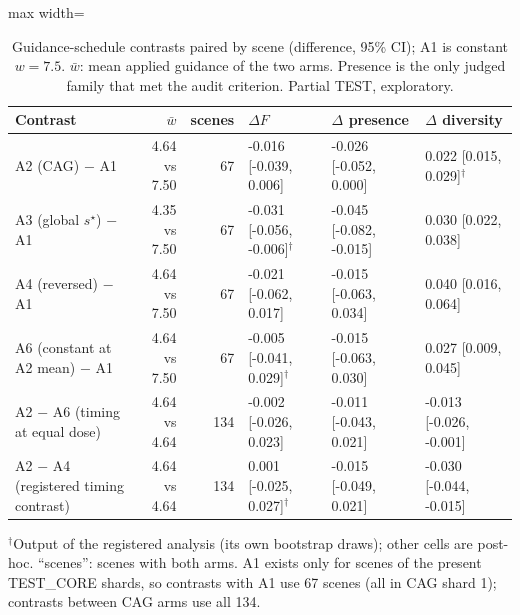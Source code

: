 \begin{table}[t]\centering\small
\caption{Guidance-schedule contrasts paired by scene (difference, 95\% CI); A1 is constant $w = 7.5$. $\bar w$: mean applied guidance of the two arms. Presence is the only judged family that met the audit criterion. Partial TEST, exploratory.}\label{tab:partial-he-arms}
\begin{adjustbox}{max width=\linewidth}\begin{tabular}{lrrlll}
\toprule
Contrast & $\bar w$ & scenes & $\Delta F$ & $\Delta$ presence & $\Delta$ diversity \\
\midrule
A2 (CAG) $-$ A1 & 4.64 vs 7.50 & 67 & -0.016 [-0.039, 0.006] & -0.026 [-0.052, 0.000] & 0.022 [0.015, 0.029]$^{\dagger}$ \\
A3 (global $s^\star$) $-$ A1 & 4.35 vs 7.50 & 67 & -0.031 [-0.056, -0.006]$^{\dagger}$ & -0.045 [-0.082, -0.015] & 0.030 [0.022, 0.038] \\
A4 (reversed) $-$ A1 & 4.64 vs 7.50 & 67 & -0.021 [-0.062, 0.017] & -0.015 [-0.063, 0.034] & 0.040 [0.016, 0.064] \\
A6 (constant at A2 mean) $-$ A1 & 4.64 vs 7.50 & 67 & -0.005 [-0.041, 0.029]$^{\dagger}$ & -0.015 [-0.063, 0.030] & 0.027 [0.009, 0.045] \\
A2 $-$ A6 (timing at equal dose) & 4.64 vs 4.64 & 134 & -0.002 [-0.026, 0.023] & -0.011 [-0.043, 0.021] & -0.013 [-0.026, -0.001] \\
A2 $-$ A4 (registered timing contrast) & 4.64 vs 4.64 & 134 & 0.001 [-0.025, 0.027]$^{\dagger}$ & -0.015 [-0.049, 0.021] & -0.030 [-0.044, -0.015] \\
\bottomrule
\end{tabular}\end{adjustbox}
\par\smallskip\footnotesize $^{\dagger}$Output of the registered analysis (its own bootstrap draws); other cells are post-hoc. ``scenes'': scenes with both arms. A1 exists only for scenes of the present TEST\_CORE shards, so contrasts with A1 use 67 scenes (all in CAG shard 1); contrasts between CAG arms use all 134.
\end{table}
